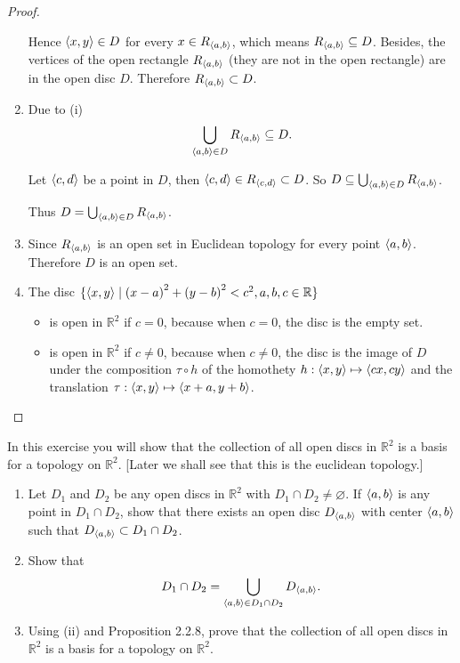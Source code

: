 \begin{proof}
\begin{enumerate}[label={(\roman*)}]
              Hence $\left\langle{x, y}\right\rangle\in D$ for every $x\in R_{\left\langle{a, b}\right\rangle}$, which means $R_{\left\langle{a, b}\right\rangle}\subseteq D$. Besides, the vertices of the open rectangle $R_{\left\langle{a, b}\right\rangle}$ (they are not in the open rectangle) are in the open disc $D$. Therefore $R_{\left\langle{a, b}\right\rangle}\subset D$.
        \item Due to (i)
              \[
                  \bigcup_{\left\langle{a, b}\right\rangle\in D} R_{\left\langle{a, b}\right\rangle}\subseteq D.
              \]

              Let $\left\langle{c, d}\right\rangle$ be a point in $D$, then $\left\langle{c, d}\right\rangle\in R_{\left\langle{c, d}\right\rangle}\subset D$. So $D\subseteq \bigcup_{\left\langle{a, b}\right\rangle\in D} R_{\left\langle{a, b}\right\rangle}$.

              Thus $D = \bigcup_{\left\langle{a, b}\right\rangle\in D} R_{\left\langle{a, b}\right\rangle}$.
        \item Since $R_{\left\langle{a, b}\right\rangle}$ is an open set in Euclidean topology for every point $\left\langle{a, b}\right\rangle$. Therefore $D$ is an open set.
        \item The disc $\{ \left\langle{x, y}\right\rangle \mid {(x-a)}^{2} + {(y - b)}^{2} < c^{2}, a, b, c\in\mathbb{R} \}$
              \begin{itemize}
                  \item is open in $\mathbb{R}^{2}$ if $c = 0$, because when $c = 0$, the disc is the empty set.
                  \item is open in $\mathbb{R}^{2}$ if $c\ne 0$, because when $c\ne 0$, the disc is the image of $D$ under the composition $\tau\circ h$ of the homothety $h: \left\langle{x, y}\right\rangle\mapsto \left\langle{cx, cy}\right\rangle$ and the translation $\tau: \left\langle{x, y}\right\rangle \mapsto \left\langle{x+a, y+b}\right\rangle$.
              \end{itemize}
    \end{enumerate}
\end{proof}
\newpage

\begin{exercise}
    In this exercise you will show that the collection of all open discs in $\mathbb{R}^{2}$ is a basis for a topology on $\mathbb{R}^{2}$. [Later we shall see that this is the euclidean topology.]
    \begin{enumerate}[label={(\roman*)}]
        \item Let $D_{1}$ and $D_{2}$ be any open discs in $\mathbb{R}^{2}$ with $D_{1}\cap D_{2}\ne \varnothing$. If $\left\langle{a, b}\right\rangle$ is any point in $D_{1}\cap D_{2}$, show that there exists an open disc $D_{\left\langle{a,b}\right\rangle}$ with center $\left\langle{a, b}\right\rangle$ such that $D_{\left\langle{a, b}\right\rangle}\subset D_{1}\cap D_{2}$.
        \item Show that
              \[
                  D_{1}\cap D_{2} = \bigcup_{\left\langle{a, b}\right\rangle\in D_{1}\cap D_{2}} D_{\left\langle{a, b}\right\rangle}.
              \]
        \item Using (ii) and Proposition 2.2.8, prove that the collection of all open discs in $\mathbb{R}^{2}$ is a basis for a topology on $\mathbb{R}^{2}$.
    \end{enumerate}
\end{exercise}

